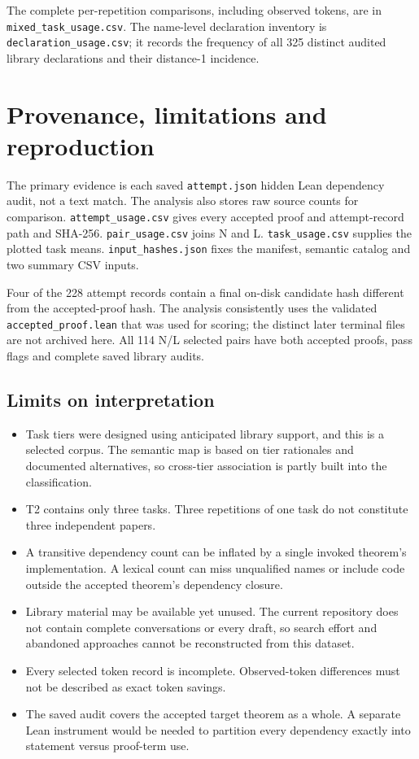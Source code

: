 \documentclass[10pt]{article}
\newcommand{\sourcepath}[1]{\nolinkurl{#1}}
\begin{document}
The complete per-repetition comparisons, including observed tokens, are in \sourcepath{mixed_task_usage.csv}. The name-level declaration inventory is \sourcepath{declaration_usage.csv}; it records the frequency of all 325 distinct audited library declarations and their distance-1 incidence.

\clearpage
\section{Provenance, limitations and reproduction}

The primary evidence is each saved \texttt{attempt.json} hidden Lean dependency audit, not a text match. The analysis also stores raw source counts for comparison. \sourcepath{attempt_usage.csv} gives every accepted proof and attempt-record path and SHA-256. \sourcepath{pair_usage.csv} joins N and L. \sourcepath{task_usage.csv} supplies the plotted task means. \sourcepath{input_hashes.json} fixes the manifest, semantic catalog and two summary CSV inputs.

Four of the 228 attempt records contain a final on-disk candidate hash different from the accepted-proof hash. The analysis consistently uses the validated \texttt{accepted\_proof.lean} that was used for scoring; the distinct later terminal files are not archived here. All 114 N/L selected pairs have both accepted proofs, pass flags and complete saved library audits.

\subsection*{Limits on interpretation}

\begin{itemize}
\item Task tiers were designed using anticipated library support, and this is a selected corpus. The semantic map is based on tier rationales and documented alternatives, so cross-tier association is partly built into the classification.
\item T2 contains only three tasks. Three repetitions of one task do not constitute three independent papers.
\item A transitive dependency count can be inflated by a single invoked theorem's implementation. A lexical count can miss unqualified names or include code outside the accepted theorem's dependency closure.
\item Library material may be available yet unused. The current repository does not contain complete conversations or every draft, so search effort and abandoned approaches cannot be reconstructed from this dataset.
\item Every selected token record is incomplete. Observed-token differences must not be described as exact token savings.
\item The saved audit covers the accepted target theorem as a whole. A separate Lean instrument would be needed to partition every dependency exactly into statement versus proof-term use.
\end{itemize}
\end{document}
